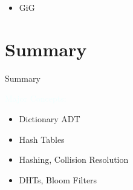 \documentclass{beamer}
\newcommand{\tblue}[1]{{\Large {\textcolor{azure}{#1}}}}
\begin{document}
\begin{frame}{}
    \begin{itemize}
        \item GiG
    \end{itemize}
\end{frame}



\section{Summary}

\begin{frame}{Summary}

\tblue{Major Concepts:}
\begin{itemize}
\item Dictionary ADT 
\item Hash Tables  
\item Hashing, Collision Resolution
\item DHTs, Bloom Filters
\end{itemize}
\end{frame}
\end{document}

